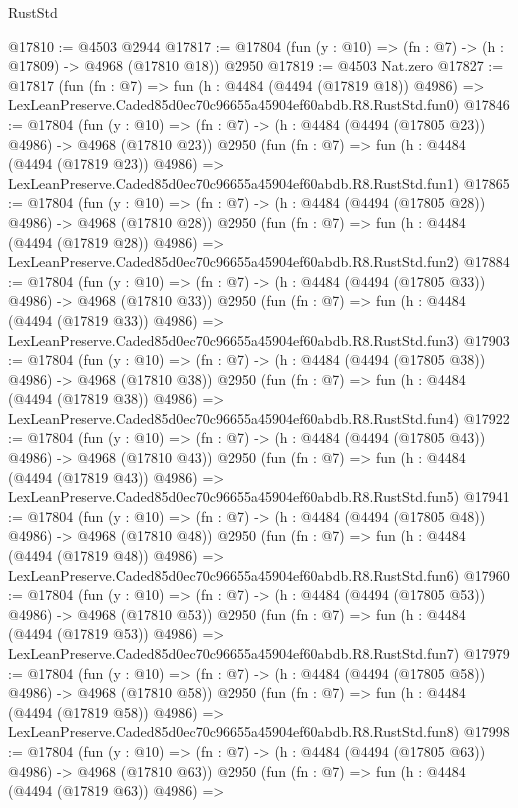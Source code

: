 \begin{lexlean}{RustStd}
\begin{coremodule}
@17810 := @4503 @2944
@17817 := @17804 (fun (y : @10) => (fn : @7) -> (h : @17809) -> @4968 (@17810 @18)) @2950
@17819 := @4503 Nat.zero
@17827 := @17817
    (fun (fn : @7) =>
    fun (h : @4484 (@4494 (@17819 @18)) @4986) =>
    LexLeanPreserve.Caded85d0ec70c96655a45904ef60abdb.R8.RustStd.fun0)
@17846 := @17804
    (fun (y : @10) => (fn : @7) -> (h : @4484 (@4494 (@17805 @23)) @4986) -> @4968 (@17810 @23))
    @2950
    (fun (fn : @7) =>
    fun (h : @4484 (@4494 (@17819 @23)) @4986) =>
    LexLeanPreserve.Caded85d0ec70c96655a45904ef60abdb.R8.RustStd.fun1)
@17865 := @17804
    (fun (y : @10) => (fn : @7) -> (h : @4484 (@4494 (@17805 @28)) @4986) -> @4968 (@17810 @28))
    @2950
    (fun (fn : @7) =>
    fun (h : @4484 (@4494 (@17819 @28)) @4986) =>
    LexLeanPreserve.Caded85d0ec70c96655a45904ef60abdb.R8.RustStd.fun2)
@17884 := @17804
    (fun (y : @10) => (fn : @7) -> (h : @4484 (@4494 (@17805 @33)) @4986) -> @4968 (@17810 @33))
    @2950
    (fun (fn : @7) =>
    fun (h : @4484 (@4494 (@17819 @33)) @4986) =>
    LexLeanPreserve.Caded85d0ec70c96655a45904ef60abdb.R8.RustStd.fun3)
@17903 := @17804
    (fun (y : @10) => (fn : @7) -> (h : @4484 (@4494 (@17805 @38)) @4986) -> @4968 (@17810 @38))
    @2950
    (fun (fn : @7) =>
    fun (h : @4484 (@4494 (@17819 @38)) @4986) =>
    LexLeanPreserve.Caded85d0ec70c96655a45904ef60abdb.R8.RustStd.fun4)
@17922 := @17804
    (fun (y : @10) => (fn : @7) -> (h : @4484 (@4494 (@17805 @43)) @4986) -> @4968 (@17810 @43))
    @2950
    (fun (fn : @7) =>
    fun (h : @4484 (@4494 (@17819 @43)) @4986) =>
    LexLeanPreserve.Caded85d0ec70c96655a45904ef60abdb.R8.RustStd.fun5)
@17941 := @17804
    (fun (y : @10) => (fn : @7) -> (h : @4484 (@4494 (@17805 @48)) @4986) -> @4968 (@17810 @48))
    @2950
    (fun (fn : @7) =>
    fun (h : @4484 (@4494 (@17819 @48)) @4986) =>
    LexLeanPreserve.Caded85d0ec70c96655a45904ef60abdb.R8.RustStd.fun6)
@17960 := @17804
    (fun (y : @10) => (fn : @7) -> (h : @4484 (@4494 (@17805 @53)) @4986) -> @4968 (@17810 @53))
    @2950
    (fun (fn : @7) =>
    fun (h : @4484 (@4494 (@17819 @53)) @4986) =>
    LexLeanPreserve.Caded85d0ec70c96655a45904ef60abdb.R8.RustStd.fun7)
@17979 := @17804
    (fun (y : @10) => (fn : @7) -> (h : @4484 (@4494 (@17805 @58)) @4986) -> @4968 (@17810 @58))
    @2950
    (fun (fn : @7) =>
    fun (h : @4484 (@4494 (@17819 @58)) @4986) =>
    LexLeanPreserve.Caded85d0ec70c96655a45904ef60abdb.R8.RustStd.fun8)
@17998 := @17804
    (fun (y : @10) => (fn : @7) -> (h : @4484 (@4494 (@17805 @63)) @4986) -> @4968 (@17810 @63))
    @2950
    (fun (fn : @7) =>
    fun (h : @4484 (@4494 (@17819 @63)) @4986) =>

\end{coremodule}
\end{lexlean}
